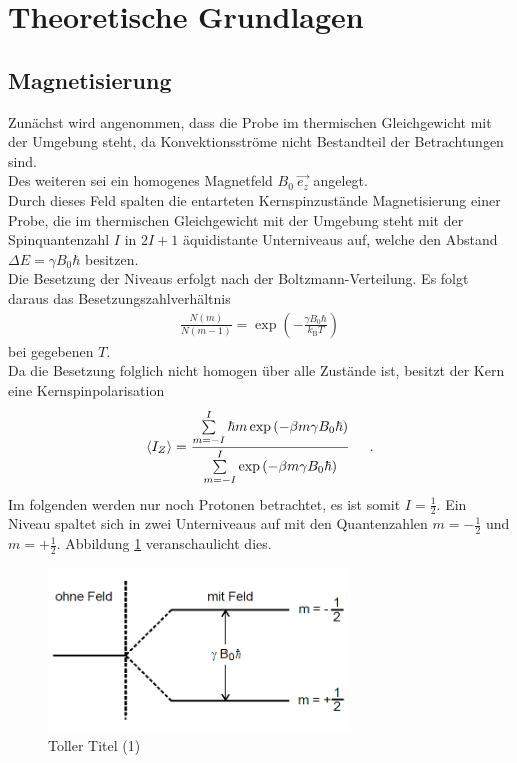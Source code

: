 \documentclass[]{scrartcl}
\begin{document}
\section{Theoretische Grundlagen}
\subsection{Magnetisierung}
Zunächst wird angenommen, dass die Probe im thermischen Gleichgewicht mit der Umgebung steht, da Konvektionsströme nicht Bestandteil der Betrachtungen sind.\\
Des weiteren sei ein homogenes Magnetfeld $B_0\ \vec{e_z}$ angelegt.\\
Durch dieses Feld spalten die entarteten Kernspinzustände
Magnetisierung einer Probe, die im thermischen Gleichgewicht mit der Umgebung steht mit der Spinquantenzahl $I$ in $2I+1$ äquidistante Unterniveaus auf, welche den Abstand $\Delta E = \gamma B_0 \hbar$ besitzen.\\
Die Besetzung der Niveaus erfolgt nach der Boltzmann-Verteilung. Es folgt daraus das Besetzungszahlverhältnis 
\begin{align}
\frac{N\left(m\right)}{N\left(m-1\right)}=\exp \left(-\frac{\gamma B_0\hbar}{k_\text{B}T}\right)
\end{align}
bei gegebenen $T$.\\
Da die Besetzung folglich nicht homogen über alle Zustände ist, besitzt der Kern eine Kernspinpolarisation
\begin{align}
\left\langle I_Z \right\rangle = \frac{\sum\limits_{m=-I}^{I} \hbar m \exp\left(-\beta m\gamma B_0 \hbar \right)}{\sum\limits_{m=-I}^{I} \exp\left(-\beta m\gamma B_0 \hbar \right)} \label{eq_izallgemein}\hspace*{0.5cm}\text{.}
\end{align}
Im folgenden werden nur noch Protonen betrachtet, es ist somit $I=\frac{1}{2}$. Ein Niveau spaltet sich in zwei Unterniveaus auf mit den Quantenzahlen $m=-\frac{1}{2}$ und $m=+\frac{1}{2}$. Abbildung \ref{fig_aufspaltung} veranschaulicht dies.
\begin{figure}[H]
\centering
\includegraphics[width=8cm]{images/aufspaltung_magnetfeld.png}
\caption{Toller Titel (1)}
\label{fig_aufspaltung}
\end{figure}
\end{document}
